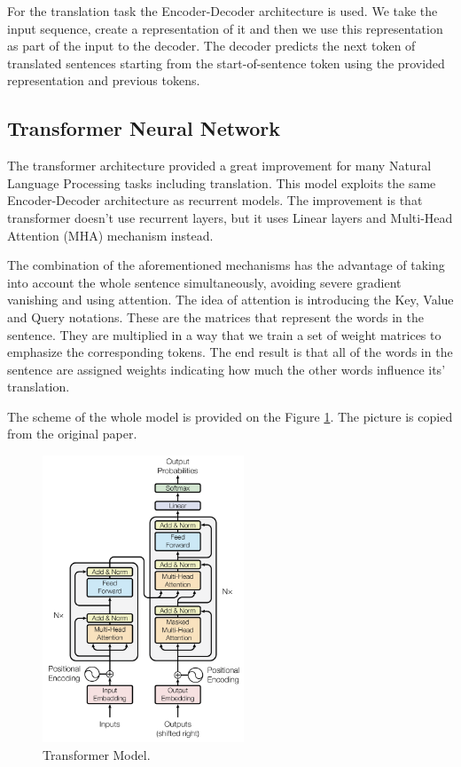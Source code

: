 \documentclass{article}
\begin{document}
For the translation task the Encoder-Decoder architecture is used. We take the input sequence, create a representation of it and then we use this representation as part of the input to the decoder. The decoder predicts the next token of translated sentences starting from the start-of-sentence token using the provided representation and previous tokens.

\subsection*{Transformer Neural Network}

The transformer architecture \cite{Vaswani2017} provided a great improvement for many Natural Language Processing tasks including translation. This model exploits the same Encoder-Decoder architecture as recurrent models. The improvement is that transformer doesn't use recurrent layers, but it uses Linear layers and Multi-Head Attention (MHA) mechanism instead.

The combination of the aforementioned mechanisms has the advantage of taking into account the whole sentence simultaneously, avoiding severe gradient vanishing and using attention. The idea of attention is introducing the Key, Value and Query notations. These are the matrices that represent the words in the sentence. They are multiplied in a way that we train a set of weight matrices to emphasize the corresponding tokens. The end result is that all of the words in the sentence are assigned weights indicating how much the other words influence its' translation.

The scheme of the whole model is provided on the Figure \ref{fig:Transformer}. The picture is copied from the original paper.

\begin{figure}
  \centering
  \includegraphics[width=60mm]{imgs/transformer_model.png}
  \caption{Transformer Model.}
  \label{fig:Transformer}
\end{figure}
\end{document}
